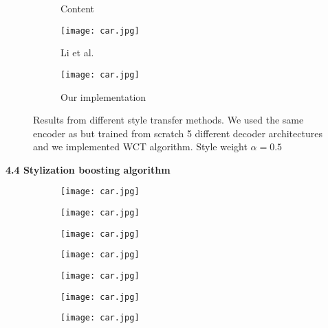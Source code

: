 \begin{flushleft}
\begin{flushleft}
\begin{figure}[h!]
\begin{subfigure}[b]{0.225\linewidth}
		\caption{Content}
	\end{subfigure}
	\begin{subfigure}[b]{0.225\linewidth}
		\texttt{[image: car.jpg]} %
		\caption{Li et al. \cite{bib11}}
	\end{subfigure}
	\begin{subfigure}[b]{0.225\linewidth}
		\texttt{[image: car.jpg]} %
		\caption{Our implementation}
	\end{subfigure}
	\caption{Results from different style transfer methods. We used the same encoder as \cite{bib11} but trained from scratch 5 different decoder architectures and we implemented WCT algorithm. Style weight $\alpha=0.5$}
	\label{fig:style_transfer}
\end{figure}
\begin{flushleft}
	\textbf{4.4 Stylization boosting algorithm}\newline
\end{flushleft}
\begin{figure}[h!]
	\centering
	\begin{subfigure}[b]{0.225\linewidth}
		\texttt{[image: car.jpg]} %
	\end{subfigure}
	\begin{subfigure}[b]{0.225\linewidth}
		\texttt{[image: car.jpg]} %
	\end{subfigure}
	\begin{subfigure}[b]{0.225\linewidth}
		\texttt{[image: car.jpg]} %
	\end{subfigure}
	\begin{subfigure}[b]{0.225\linewidth}
		\texttt{[image: car.jpg]} %
	\end{subfigure}
	\centering
	\begin{subfigure}[b]{0.225\linewidth}
		\texttt{[image: car.jpg]} %
	\end{subfigure}
	\begin{subfigure}[b]{0.225\linewidth}
		\texttt{[image: car.jpg]} %
	\end{subfigure}
	\begin{subfigure}[b]{0.225\linewidth}
		\texttt{[image: car.jpg]} %
	\end{subfigure}

\end{figure}
\end{flushleft}
\end{flushleft}
